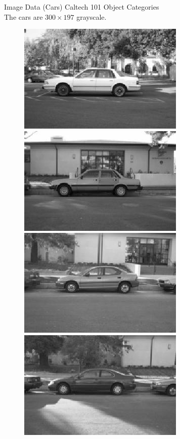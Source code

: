 \documentclass{beamer}
\begin{document}
\begin{frame}{Image Data (Cars)}
  Caltech 101 Object Categories \cite{fei2007learning} \\
  The cars are $300\times 197$ grayscale.
  \begin{figure}[!ht]
    \centering
    \includegraphics[scale=.4]{car-image_0001.jpg}
    \includegraphics[scale=.4]{car-image_0002.jpg} \\
    \includegraphics[scale=.4]{car-image_0003.jpg}
    \includegraphics[scale=.4]{car-image_0004.jpg}
  \end{figure}
\end{frame}
\end{document}
